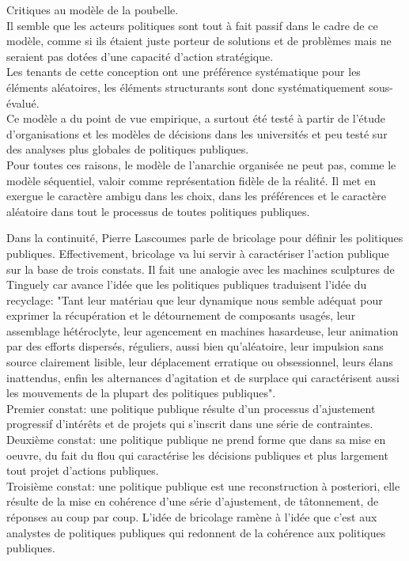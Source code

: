 \documentclass[10pt, a4paper, openany]{book}
\begin{document}
Critiques au modèle de la poubelle. \\
Il semble que les acteurs politiques sont tout à fait passif dans le cadre de ce modèle, comme si ils étaient juste porteur de solutions et de problèmes mais ne seraient pas dotées d'une capacité d'action stratégique. \\
Les tenants de cette conception ont une préférence systématique pour les éléments aléatoires, les éléments structurants sont donc systématiquement sous-évalué. \\
Ce modèle a du point de vue empirique, a surtout été testé à partir de l'étude d'organisations et les modèles de décisions dans les universités et peu testé sur des analyses plus globales de politiques publiques. \\
Pour toutes ces raisons, le modèle de l'anarchie organisée ne peut pas, comme le modèle séquentiel, valoir comme représentation fidèle de la réalité. Il met en exergue le caractère ambigu dans les choix, dans les préférences et le caractère aléatoire dans tout le processus de toutes politiques publiques.


Dans la continuité, Pierre Lascoumes parle de bricolage pour définir les politiques publiques. Effectivement, bricolage va lui servir à caractériser l'action publique sur la base de trois constats. Il fait une analogie avec les machines sculptures de Tinguely car avance l'idée que les politiques publiques traduisent l'idée du recyclage: "Tant leur matériau que leur dynamique nous semble adéquat pour exprimer la récupération et le détournement de composants usagés, leur assemblage hétéroclyte, leur agencement en machines hasardeuse, leur animation par des efforts dispersés, réguliers, aussi bien qu'aléatoire, leur impulsion sans source clairement lisible, leur déplacement erratique ou obsessionnel, leurs élans inattendus, enfin les alternances d'agitation et de surplace qui caractérisent aussi les mouvements de la plupart des politiques publiques". \\
Premier constat: une politique publique résulte d'un processus d'ajustement progressif d'intérêts et de projets qui s'inscrit dans une série de contraintes. \\
Deuxième constat: une politique publique ne prend forme que dans sa mise en oeuvre, du fait du flou qui caractérise les décisions publiques et plus largement tout projet d'actions publiques. \\
Troisième constat: une politique publique est une reconstruction à posteriori, elle résulte de la mise en cohérence d'une série d'ajustement, de tâtonnement, de réponses au coup par coup. L'idée de bricolage ramène à l'idée que c'est aux analystes de politiques publiques qui redonnent de la cohérence aux politiques publiques. 
\end{document}
